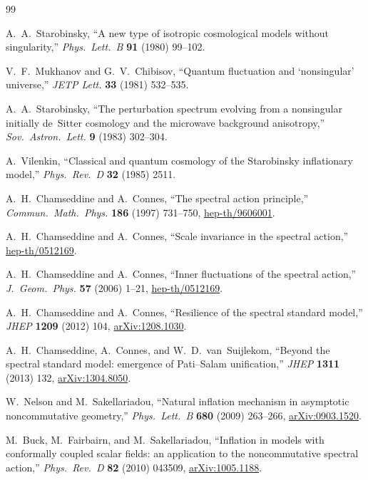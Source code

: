 \documentclass[11pt,a4paper]{article}
\theoremstyle{plain}
\theoremstyle{definition}
\begin{document}
\begin{thebibliography}{99}

A.~A.~Starobinsky,
``A new type of isotropic cosmological models without singularity,''
\emph{Phys.\ Lett.\ B} \textbf{91} (1980) 99--102.

V.~F.~Mukhanov and G.~V.~Chibisov,
``Quantum fluctuation and `nonsingular' universe,''
\emph{JETP Lett.} \textbf{33} (1981) 532--535.

A.~A.~Starobinsky,
``The perturbation spectrum evolving from a nonsingular initially
de~Sitter cosmology and the microwave background anisotropy,''
\emph{Sov.\ Astron.\ Lett.} \textbf{9} (1983) 302--304.

A.~Vilenkin,
``Classical and quantum cosmology of the Starobinsky inflationary model,''
\emph{Phys.\ Rev.\ D} \textbf{32} (1985) 2511.

A.~H.~Chamseddine and A.~Connes,
``The spectral action principle,''
\emph{Commun.\ Math.\ Phys.} \textbf{186} (1997) 731--750,
\href{https://arxiv.org/abs/hep-th/9606001}{hep-th/9606001}.

A.~H.~Chamseddine and A.~Connes,
``Scale invariance in the spectral action,''
\href{https://arxiv.org/abs/hep-th/0512169}{hep-th/0512169}.

A.~H.~Chamseddine and A.~Connes,
``Inner fluctuations of the spectral action,''
\emph{J.\ Geom.\ Phys.} \textbf{57} (2006) 1--21,
\href{https://arxiv.org/abs/hep-th/0512169}{hep-th/0512169}.

A.~H.~Chamseddine and A.~Connes,
``Resilience of the spectral standard model,''
\emph{JHEP} \textbf{1209} (2012) 104,
\href{https://arxiv.org/abs/1208.1030}{arXiv:1208.1030}.

A.~H.~Chamseddine, A.~Connes, and W.~D.~van~Suijlekom,
``Beyond the spectral standard model: emergence of Pati--Salam
unification,''
\emph{JHEP} \textbf{1311} (2013) 132,
\href{https://arxiv.org/abs/1304.8050}{arXiv:1304.8050}.

W.~Nelson and M.~Sakellariadou,
``Natural inflation mechanism in asymptotic noncommutative geometry,''
\emph{Phys.\ Lett.\ B} \textbf{680} (2009) 263--266,
\href{https://arxiv.org/abs/0903.1520}{arXiv:0903.1520}.

M.~Buck, M.~Fairbairn, and M.~Sakellariadou,
``Inflation in models with conformally coupled scalar fields:
an application to the noncommutative spectral action,''
\emph{Phys.\ Rev.\ D} \textbf{82} (2010) 043509,
\href{https://arxiv.org/abs/1005.1188}{arXiv:1005.1188}.


\end{thebibliography}
\end{document}
